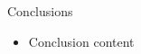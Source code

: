 \documentclass[final]{beamer}
\newcommand{\nonparallel}[1]{\textcolor{tablue20orange}{#1}}
\newcommand{\mybf}[1]{\textcolor{darkestgray}{\textbf{#1}}}
\begin{document}
\begin{frame}[t]
\begin{columns}[T]
\begin{column}{.33\linewidth}
\begin{minipage}[T]{.97\textwidth}
{%
\begin{block}{Conclusions}
\vspace{-0.23cm}
\begin{itemize}
    \setlength{\itemsep}{0.5ex}
    \item Conclusion content


\end{itemize}
\end{block}



}\end{minipage}
\end{column}



\begin{column}{.01\linewidth}\end{column} %

\end{columns}
\end{frame}
\end{document}
